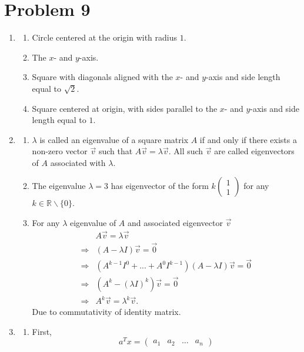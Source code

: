 \documentclass[11pt]{article}
\begin{document}
\section{Problem 9}
\begin{enumerate}
\item
  \begin{enumerate}
  \item Circle centered at the origin with radius $1$.
  \item The $x$- and $y$-axis.
  \item Square with diagonals aligned with the $x$- and
    $y$-axis and side length equal to $\sqrt{2}$.
  \item Square centered at origin, with sides parallel to the $x$- and $y$-axis
    and side length equal to $1$.
  \end{enumerate}
\item
  \begin{enumerate}
    \item
      $\lambda$ is called an eigenvalue of a square matrix $A$ if and only if
      there exists a non-zero vector $\vec{v}$ such
      that $A\vec{v} = \lambda \vec{v}$.
      All such $\vec{v}$ are called eigenvectors of $A$ associated with
      $\lambda$.
    \item The eigenvalue $\lambda = 3$ has eigenvector of the form
      $k\begin{pmatrix} 1 \\ 1\end{pmatrix}$ for any $k \in \mathbb{R}\backslash \{0\}$.
    \item
      For any $\lambda$ eigenvalue of $A$ and associated eigenvector $\vec{v}$
      \begin{align*}
        &A\vec{v} = \lambda \vec{v}\\
        \Rightarrow &(A - \lambda I) \vec{v} = \vec{0}\\
        \Rightarrow &(A^{k-1}I^0 + ... + A^0I^{k-1})(A - \lambda I) \vec{v} = \vec{0}\\
        \Rightarrow &(A^k - (\lambda I)^k) \vec{v} = \vec{0}\\
        \Rightarrow &A^k\vec{v} = \lambda^k \vec{v}.
      \end{align*}
      Due to commutativity of identity matrix.
  \end{enumerate}
\item
  \begin{enumerate}
  \item First,
    \[a^Tx = \begin{pmatrix} a_1 &a_2 &\dots &a_n\end{pmatrix}
\]
\end{enumerate}
\end{enumerate}
\end{document}
